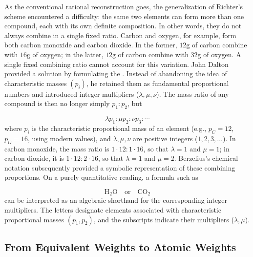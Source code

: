 \documentclass[submitted,12pt]{article}
\begin{document}
As the conventional rational reconstruction goes, the generalization of Richter's scheme encountered a difficulty: the same two elements can form more than one compound, each with its own definite composition. In other words, they do not always combine in a single fixed ratio. Carbon and oxygen, for example, form both carbon monoxide and carbon dioxide. In the former, $12\text{g}$ of carbon combine with $16\text{g}$ of oxygen; in the latter, $12\text{g}$ of carbon combine with $32\text{g}$ of oxygen. A single fixed combining ratio cannot account for this variation. John Dalton provided a solution by formulating the . Instead of abandoning the idea of characteristic masses $\left(p_i\right)$, he retained them as fundamental proportional numbers and introduced integer multipliers ($\lambda, \mu, \nu$). The mass ratio of any compound is then no longer simply $p_1: p_2$, but

\begin{equation*}
\lambda p_1 : \mu p_2 : \nu p_3 : \cdots
\end{equation*}
%
where $p_i$ is the characteristic proportional mass of an element (e.g., $p_C=12$, $p_O=16$, using modern values), and $\lambda, \mu, \nu$ are positive integers ($1, 2, 3, \ldots$). In carbon monoxide, the mass ratio is $1 \cdot 12 : 1 \cdot 16$, so that $\lambda=1$ and $\mu=1$; in carbon dioxide, it is $1 \cdot 12 : 2 \cdot 16$, so that $\lambda=1$ and $\mu=2$. Berzelius's chemical notation subsequently provided a symbolic representation of these combining proportions. On a purely quantitative reading, a formula such as

\begin{equation*}
\mathrm{H}_2\mathrm{O} \quad \text{or} \quad \mathrm{CO}_2
\end{equation*}
%
can be interpreted as an algebraic shorthand for the corresponding integer multipliers. The letters designate elements associated with characteristic proportional masses $\left(p_1, p_2\right)$, and the subscripts indicate their multipliers ($\lambda, \mu$).


\subsection{From Equivalent Weights to Atomic Weights}
\end{document}
